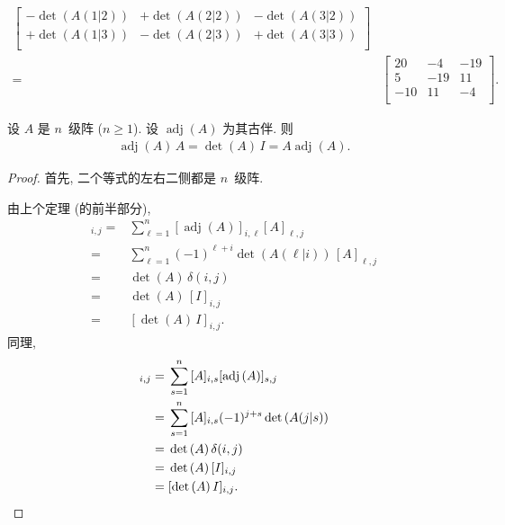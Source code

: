 \begin{example}
\begin{align*}
\begin{bmatrix}
            -\det {(A(1|2))}
             & +\det {(A(2|2))}
             & -\det {(A(3|2))} \\
            +\det {(A(1|3))}
             & -\det {(A(2|3))}
             & +\det {(A(3|3))} \\
        \end{bmatrix}
        \\
        = {} &
        \begin{bmatrix}
            20  & -4  & -19 \\
            5   & -19 & 11  \\
            -10 & 11  & -4  \\
        \end{bmatrix}.
    \end{align*}
\end{example}

\begin{theorem}
    设 \(A\) 是 \(n\)~级阵 (\(n \geq 1\)).
    设 \(\operatorname{adj} {(A)}\) 为其古伴.
    则
    \begin{align*}
        \operatorname{adj} {(A)}\, A
        = \det {(A)}\, I
        = A \operatorname{adj} {(A)}.
    \end{align*}
\end{theorem}

\begin{proof}
    首先, 二个等式的左右二侧都是 \(n\)~级阵.

    由上个定理 (的前半部分),
    \begin{align*}
        [\operatorname{adj} {(A)}\, A]_{i,j}
        = {} &
        \sum_{\ell = 1}^{n}
        {[\operatorname{adj} {(A)}]_{i,\ell} [A]_{\ell,j}}
        \\
        = {} &
        \sum_{\ell = 1}^{n}
        {(-1)^{\ell+i} \det {(A(\ell|i))}\, [A]_{\ell,j}}
        \\
        = {} & \det {(A)}\, \delta(i, j)
        \\
        = {} & \det {(A)}\, [I]_{i,j}
        \\
        = {} & [\det {(A)}\, I]_{i,j}.
    \end{align*}
    同理,
    \begin{align*}
        [A \operatorname{adj} {(A)}]_{i,j}
        = {} &
        \sum_{s = 1}^{n}
        {[A]_{i,s} [\operatorname{adj} {(A)}]_{s,j}}
        \\
        = {} &
        \sum_{s = 1}^{n}
        {[A]_{i,s} (-1)^{j+s} \det {(A(j|s))}}
        \\
        = {} & \det {(A)}\, \delta(i, j)
        \\
        = {} & \det {(A)}\, [I]_{i,j}
        \\
        = {} & [\det {(A)}\, I]_{i,j}.
        \qedhere
    \end{align*}
\end{proof}


